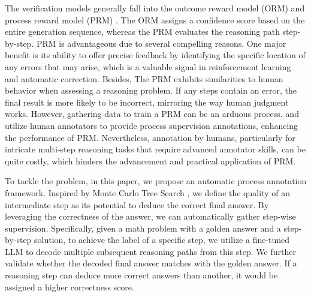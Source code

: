 The verification models generally fall into the outcome reward model (ORM) \citep{cobbe2021training,ovm} and process reward model (PRM) \citep{li-etal-2023-making,uesato2022solving,lightman2023let,ma2023let}.  The ORM assigns a confidence score based on the entire generation sequence, whereas the PRM evaluates the reasoning path step-by-step.  PRM is advantageous due to several compelling reasons.  One major benefit is its ability to offer precise feedback by identifying the specific location of any errors that may arise, which is a valuable signal in reinforcement learning and automatic correction. Besides, The PRM exhibits similarities to human behavior when assessing a reasoning problem. If any steps contain an error, the final result is more likely to be incorrect, mirroring the way human judgment works. However, gathering data to train a PRM can be an arduous process. \cite{uesato2022solving} and \cite{lightman2023let} utilize human annotators to provide process supervision annotations, enhancing the performance of PRM. Nevertheless, annotation by humans, particularly for intricate multi-step reasoning tasks that require advanced annotator skills, can be quite costly, which hinders the advancement and practical application of PRM.

To tackle the problem, in this paper, we propose an automatic process annotation framework. Inspired by Monte Carlo Tree Search \citep{kocsis2006bandit,coulom2006efficient,silver2016mastering,swiechowski2023monte}, we define the quality of an intermediate step as its potential to deduce the correct final answer. By leveraging the correctness of the answer, we can automatically gather step-wise supervision. Specifically, given a math problem with a golden answer and a step-by-step solution, to achieve the label of a specific step, we utilize a fine-tuned LLM to decode multiple subsequent reasoning paths from this step. We further validate whether the decoded final answer matches with the golden answer. If a reasoning step can deduce more correct answers than another, it would be assigned a higher correctness score.

